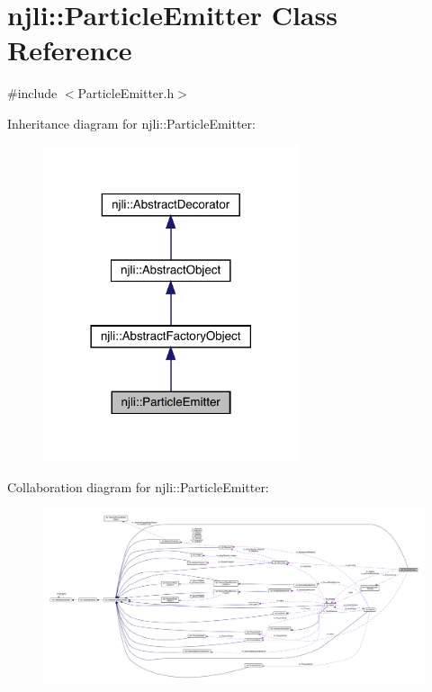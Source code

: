 \hypertarget{classnjli_1_1_particle_emitter}{}\section{njli\+:\+:Particle\+Emitter Class Reference}
\label{classnjli_1_1_particle_emitter}


{\ttfamily \#include $<$Particle\+Emitter.\+h$>$}



Inheritance diagram for njli\+:\+:Particle\+Emitter\+:\nopagebreak
\begin{figure}[H]
\begin{center}
\leavevmode
\includegraphics[width=213pt]{classnjli_1_1_particle_emitter__inherit__graph}
\end{center}
\end{figure}


Collaboration diagram for njli\+:\+:Particle\+Emitter\+:\nopagebreak
\begin{figure}[H]
\begin{center}
\leavevmode
\includegraphics[width=350pt]{classnjli_1_1_particle_emitter__coll__graph}
\end{center}
\end{figure}
